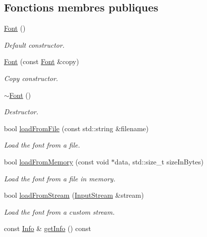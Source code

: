 \subsection*{Fonctions membres publiques}
\begin{DoxyCompactItemize}
\item 
\hyperlink{classsf_1_1Font_a506404655b8869ed60d1e7709812f583}{Font} ()
\begin{DoxyCompactList}\small\item\em Default constructor. \end{DoxyCompactList}\item 
\hyperlink{classsf_1_1Font_a72d7322b355ee2f1be4500f530e98081}{Font} (const \hyperlink{classsf_1_1Font}{Font} \&copy)
\begin{DoxyCompactList}\small\item\em Copy constructor. \end{DoxyCompactList}\item 
\hyperlink{classsf_1_1Font_aa18a3c62e6e01e9a21c531b5cad4b7f2}{$\sim$\+Font} ()
\begin{DoxyCompactList}\small\item\em Destructor. \end{DoxyCompactList}\item 
bool \hyperlink{classsf_1_1Font_ab020052ef4e01f6c749a85571c0f3fd1}{load\+From\+File} (const std\+::string \&filename)
\begin{DoxyCompactList}\small\item\em Load the font from a file. \end{DoxyCompactList}\item 
bool \hyperlink{classsf_1_1Font_abf2f8d6de31eb4e1db02e061c323e346}{load\+From\+Memory} (const void $\ast$data, std\+::size\+\_\+t size\+In\+Bytes)
\begin{DoxyCompactList}\small\item\em Load the font from a file in memory. \end{DoxyCompactList}\item 
bool \hyperlink{classsf_1_1Font_abc3f37a354ce8b9a21f8eb93bd9fdafb}{load\+From\+Stream} (\hyperlink{classsf_1_1InputStream}{Input\+Stream} \&stream)
\begin{DoxyCompactList}\small\item\em Load the font from a custom stream. \end{DoxyCompactList}\item 
const \hyperlink{structsf_1_1Font_1_1Info}{Info} \& \hyperlink{classsf_1_1Font_a7f33b30315f6ce8d8b4acfdabba065f7}{get\+Info} () const

\end{DoxyCompactItemize}
